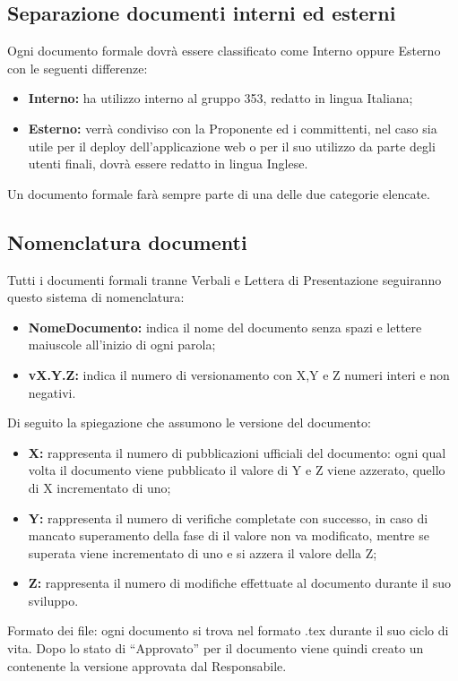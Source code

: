 \documentclass[NormeDiProgetto.tex]{subfiles}
\begin{document}
	\subsection{Separazione documenti interni ed esterni}
	Ogni documento formale dovrà essere classificato come Interno
	oppure Esterno con le seguenti differenze:
	\begin{itemize}
		\item \textbf{Interno:} ha utilizzo interno al gruppo 353, redatto in lingua Italiana;
		\item \textbf{Esterno:} verrà condiviso con la Proponente ed i committenti, nel caso sia utile per il deploy dell'applicazione web o per il suo utilizzo da parte degli utenti finali, dovrà essere redatto in lingua Inglese.
	\end{itemize}
	Un documento formale farà sempre parte di una delle due categorie elencate.
	
	\subsection{Nomenclatura documenti}
	Tutti i documenti formali tranne Verbali e Lettera di Presentazione seguiranno questo sistema di nomenclatura:

	\begin{itemize}
		\item\textbf{ NomeDocumento:} indica il nome del documento senza spazi e lettere maiuscole all'inizio di ogni parola;
		\item \textbf{vX.Y.Z:} indica il numero di versionamento con X,Y e Z numeri interi e non negativi.	
	\end{itemize}
	Di seguito la spiegazione che assumono le versione del documento:
	\begin{itemize}
		\item \textbf{X:} rappresenta il numero di pubblicazioni ufficiali del documento: ogni qual volta il documento viene pubblicato il valore di Y e Z viene azzerato, quello di X incrementato di uno;
		\item \textbf{Y:} rappresenta il numero di verifiche completate con successo, in caso di mancato superamento della fase di  il valore non va modificato, mentre se superata viene incrementato di uno e si azzera il valore della Z;
		\item \textbf{Z:} rappresenta il numero di modifiche effettuate al documento durante il suo sviluppo.	
	\end{itemize}
	Formato dei file: ogni documento si trova nel formato .tex durante il suo ciclo di vita.
	Dopo lo stato di “Approvato” per il documento viene quindi creato un  contenente la versione approvata dal Responsabile.
	
\end{document}

